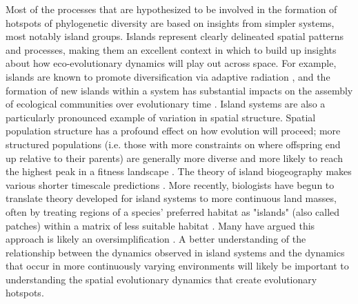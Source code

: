 \documentclass[letterpaper]{article}
\begin{document}
%
Most of the processes that are hypothesized to be involved in the formation of hotspots of phylogenetic diversity are based on insights from simpler systems, most notably island groups. Islands represent clearly delineated spatial patterns and processes, making them an excellent context in which to build up insights about how eco-evolutionary dynamics will play out across space. For example, islands are known to promote diversification via adaptive radiation \citep{losos_adaptive_2010}, and the formation of new islands within a system has substantial impacts on the assembly of ecological communities over evolutionary time \citep{gillespie_community_2004}. Island systems are also a particularly pronounced example of variation in spatial structure. Spatial population structure has a profound effect on how evolution will proceed; more structured populations (i.e. those with more constraints on where offspring end up relative to their parents) are generally more diverse and more likely to reach the highest peak in a fitness landscape \citep{tomassini_spatially_2005,nahum_tortoisehare_2015}. The theory of island biogeography makes various shorter timescale predictions \citep{macarthur_theory_1967}. More recently, biologists have begun to translate theory developed for island systems to more continuous land masses, often by treating regions of a species' preferred habitat as "islands" (also called patches) within a matrix of less suitable habitat \citep{forman_land_1995}. Many have argued this approach is likely an oversimplification \citep{mcgarigal_surface_2009,franklin_importance_2009}. A better understanding of the relationship between the dynamics observed in island systems and the dynamics that occur in more continuously varying environments will likely be important to understanding the spatial evolutionary dynamics that create evolutionary hotspots.  
\end{document}
